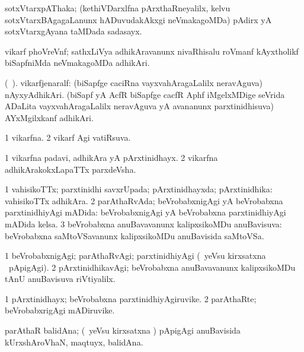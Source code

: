 {{{{{\bentry
{}
\gl{\nA}
\expl{}
\bmng
 sotxVtarxpAThaka; (kethiVDarxlfna pArxthaRneyalilx, kelvu sotxVtarxBAgagaLanunx hADuvudakAkxgi neVmakagoMDa) pAdirx yA sotxVtarxgAyana taMDada sadasayx. 
\emng
\eentry

\bentry
{} 
\gl{\nA}
\expl{}
\bmng
 vikarf phoVreVnf; sathxLiVya adhikAravanunx nivaRhisalu roVmanf kAyxtholikf biSapfniMda neVmakagoMDa adhikAri. 
\emng
\eentry

\bentry
{} 
\gl{\nA}(\bava\ ). 
\bmng
 vikarfjenaralf: 
\banum
{} (\roVkAyx biSapfge caciRna vayxvahAragaLalilx neravAguva) nAyxyAdhikAri. 
 (biSapf yA AcfR biSapfge cacfR Aphf iMgelxMDige seVrida ADaLita vayxvahAragaLalilx neravAguva yA avananunx parxtinidhisuva) AYxMgilxkanf adhikAri. 
\eanum
\emng
\eentry

\bentry
{} 
\gl{\gu}
\expl{}
\bmng
\bnum
\num{1} vikarfna. 
\num{2} vikarf Agi vatiRsuva. 
\enum
\emng
\eentry

\bentry
{} 
\gl{\nA}
\expl{}
\bmng
\bnum
\num{1} vikarfna padavi, adhikAra yA pArxtinidhayx. 
\num{2} vikarfna adhikArakokxLapaTTx parxdeVsha. 
\enum
\emng
\eentry

\bentry
{} 
\gl{\gu}
\expl{}
\bmng
\bnum
\num{1} vahisikoTTx; parxtinidhi savxrUpada; pArxtinidhayxda; pArxtinidhika:  vahisikoTTx adhikAra. 
\num{2} parAthaRvAda; beVrobabxnigAgi yA beVrobabxna parxtinidhiyAgi mADida:  beVrobabxnigAgi yA beVrobabxna parxtinidhiyAgi mADida kelsa. 
\num{3} beVrobabxna anuBavavanunx kalipxsikoMDu anuBavisuva:  beVrobabxna saMtoVSavanunx kalipxsikoMDu anuBavisida saMtoVSa. 
\enum
\emng
\eentry

\bentry
{} 
\gl{\kirxvi}
\expl{}
\bmng
\bnum
\num{1} beVrobabxnigAgi; parAthaRvAgi; parxtinidhiyAgi (\kanmu\ yeVsu kirxsatxna \vi\ pApigAgi). 
\num{2} pArxtinidhikavAgi; beVrobabxna anuBavavanunx kalipxsikoMDu tAnU anuBavisuva riVtiyalilx. 
\enum
\emng
\eentry

\bentry
{} 
\gl{\nA}
\expl{}
\bmng
\bnum
\num{1} pArxtinidhayx; beVrobabxna parxtinidhiyAgiruvike. 
\num{2} parAthaRte; beVrobabxrigAgi mADiruvike. 
\enum
\emng
\eentry

\bentry
{}
\gl{\nA}
\expl{}
\bmng
 parAthaR balidAna; (\kanmu\ yeVsu kirxsatxna \vi) pApigAgi anuBavisida kUrxshAroVhaN, maqtuyx, balidAna. 
\emng
\eentry

}}}}}
